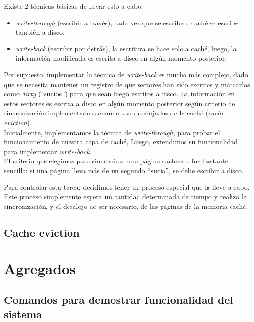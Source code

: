 \documentclass[a4paper,10pt]{article}
\begin{document}
        Existe 2 técnicas básicas de llevar esto a cabo:

        \begin{itemize}
        \item \textit{write-through} (escribir a través), cada vez que se escribe a caché se escribe también a disco.
        \item \textit{write-back} (escribir por detrás), la escritura se hace solo a caché, luego, la información modificada es escrita a disco en algún momento posterior.
        \end{itemize}

        Por supuesto, implementar la técnica de \textit{write-back} es mucho más complejo, dado que se necesita mantener un registro de que sectores han sido escritos y 
        marcarlos como \textit{dirty} (``sucios'') para que sean luego escritos a disco. La información en estos sectores es escrita a disco en algún momento posterior
        según criterio de sincronización implementado o cuando son desalojados de la caché (\textit{cache eviction}). \\

        Inicialmente, implementamos la técnica de \textit{write-through},  para probar el funcionamiento de nuestra capa de caché, 
        Luego, extendimos su funcionalidad para implementar \textit{write-back}. \\

        El criterio que elegimos para sincronizar una página cacheada fue bastante sencillo: si una página lleva más de un segundo ``sucia'', se debe escribir a disco.
        
        Para controlar esta tarea, decidimos tener un proceso especial que la lleve a cabo. Este proceso simplemente espera un cantidad determinada de tiempo y realiza 
        la sincronización, y el desalojo de ser necesario, de las páginas de la memoria caché. 

        \subsection{Cache eviction}
        

\newpage
\section{Agregados}

        \subsection{Comandos para demostrar funcionalidad del sistema}
             
\end{document}
